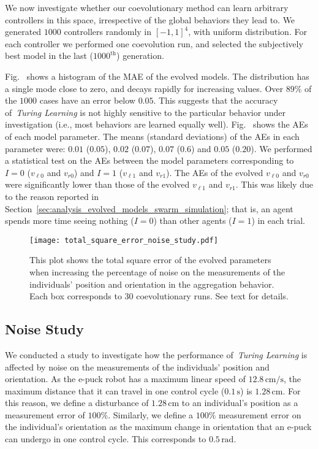 We now investigate whether our coevolutionary method can learn arbitrary controllers in this space, irrespective of the global behaviors they lead to. We generated $1000$ controllers randomly in $[-1,1]^4$, with uniform distribution. For each controller we performed one coevolution run, and selected the subjectively best model in the last ($1000^\textrm{th}$) generation. 

Fig.~ shows a histogram of the MAE of the evolved models. The distribution has a single mode close to zero, and decays rapidly for increasing values. Over $89\%$ of the $1000$ cases have an error below $0.05$. This suggests that the accuracy of~\textit{Turing Learning} is not highly sensitive to the particular behavior under investigation (i.e., most behaviors are learned equally well). Fig.~ shows the AEs of each model parameter. The means (standard deviations) of the AEs in each parameter were: $0.01$ ($0.05$), $0.02$ ($0.07$), $0.07$ ($0.6$) and $0.05$ ($0.20$). We performed a statistical test on the AEs between the model parameters corresponding to $I=0$ ($v_{\ell0}$ and $v_{r0}$) and $I=1$ ($v_{\ell1}$ and $v_{r1}$). The AEs of the evolved $v_{\ell0}$ and  $v_{r0}$ were significantly lower than those of the evolved $v_{\ell1}$ and  $v_{r1}$. This was likely due to the reason reported in Section~\ref{sec:analysis_evolved_models_swarm_simulation}; that is, an agent spends more time seeing nothing ($I=0$) than other agents ($I=1$) in each trial.
\begin{figure}[!h]%
	\centering
	\texttt{[image: total\_square\_error\_noise\_study.pdf]}
	\caption{This plot shows the total square error of the evolved parameters when increasing the percentage of noise on the measurements of the individuals' position and orientation in the aggregation behavior. Each box corresponds to 30 coevolutionary runs. See text for details.
\label{fig:total_square_error_noise_study}}
\end{figure}

\subsection{Noise Study}\label{sec:noise_study_swarm_simulation}

We conducted a study to investigate how the performance of~\textit{Turing Learning} is affected by noise on the measurements of the individuals' position and orientation. As the e-puck robot has a maximum linear speed of $12.8\,\textrm{cm/s}$, the maximum distance that it can travel in one control cycle ($0.1\,\textrm{s}$) is $1.28\,\textrm{cm}$. For this reason, we define a disturbance of $1.28\,\textrm{cm}$ to an individual's position as a measurement error of $100\%$. Similarly, we define a $100\%$ measurement error on the individual's orientation as the maximum change in orientation that an e-puck can undergo in one control cycle. This corresponds to $0.5\,\textrm{rad}$.

